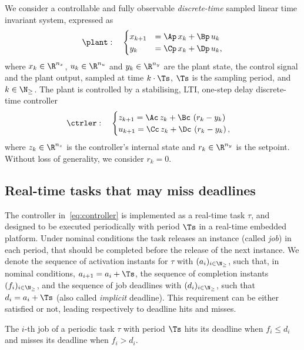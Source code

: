 We consider a controllable and fully observable \emph{discrete-time} sampled linear time invariant system, expressed as
\begin{equation}%
    \label{eq:plant}%
    \plant:\quad
    \begin{cases}
        x_{k+1} &= \Ap\,x_k + \Bp\,u_k \\
        y_{k} &= \Cp\,x_k + \Dp\,u_k,
    \end{cases}
\end{equation}
where $x_k \in \R^{n_x}$, $u_k \in \R^{n_u}$ and $y_k \in \R^{n_y}$ are the plant state, the control signal and the plant output, sampled at time $k\cdot \Ts$, $\Ts$ is the sampling period, and $k \in \N_{\geq}$.
The plant is controlled by a stabilising, LTI, one-step delay discrete-time controller
\begin{equation}%
    \label{eq:controller}%
    \ctrler:\quad
    \begin{cases}
        z_{k+1} = \Ac\,z_k + \Bc\,\left(r_k - y_k\right) \\
        u_{k+1} = \Cc\,z_k + \Dc\,\left(r_k - y_k\right),
    \end{cases}
\end{equation}
where $z_k \in \R^{n_z}$ is the controller's internal state and $r_k \in \R^{n_y}$ is the setpoint.
Without loss of generality, we consider $r_k = 0$.


\subsection{Real-time tasks that may miss deadlines}
\label{ssec:whalgebra}

The controller in~\eqref{eq:controller} is implemented as a real-time task $\tau$, and designed to be executed periodically with period $\Ts$ in a real-time embedded platform.
Under nominal conditions the task releases an instance (called \emph{job}) in each period, that should be completed before the release of the next instance.
We denote the sequence of activation instants for $\tau$ with $(a_i)_{i \in \N_{\geq}}$, such that, in nominal conditions, $a_{i+1} = a_i+\Ts$, the sequence of completion instants $(f_i)_{i \in \N_{\geq}}$, and the sequence of job deadlines with $(d_i)_{i \in \N_{\geq}}$, such that $d_i = a_i + \Ts$ (also called \emph{implicit} deadline).
This requirement can be either satisfied or not, leading respectively to deadline hits and misses.

\begin{definition}%
    \label{def:hit}%
    The $i$-th job of a periodic task $\tau$ with period $\Ts$ hits its deadline when $f_i \leq d_i$ and misses its deadline when $f_i > d_i$.
\end{definition}

